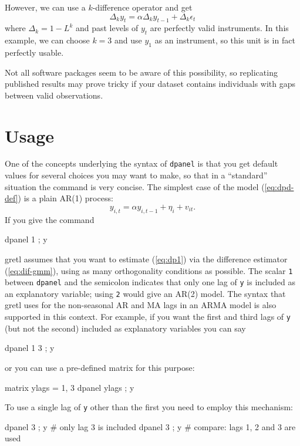 However, we can use a $k$-difference operator and get
\[
\Delta_k y_t = \alpha \Delta_k y_{t-1} + \Delta_k \epsilon_t
\]
where $\Delta_k = 1 - L^k$ and past levels of $y_t$ are perfectly
valid instruments. In this example, we can choose $k=3$ and use $y_1$
as an instrument, so this unit is in fact perfectly usable.

Not all software packages seem to be aware of this possibility, so
replicating published results may prove tricky if your dataset
contains individuals with gaps between valid observations.

\section{Usage}
\label{sec:dpanel-usage}

One of the concepts underlying the syntax of \texttt{dpanel} is that
you get default values for several choices you may want to make, so
that in a ``standard'' situation the command is very concise.  The
simplest case of the model (\ref{eq:dpd-def}) is a plain AR(1)
process:
\begin{equation}
\label{eq:dp1}
  y_{i,t} = \alpha y_{i,t-1} + \eta_{i} + v_{it} .
\end{equation}
If you give the command
\begin{code}
  dpanel 1 ; y
\end{code}
gretl assumes that you want to estimate (\ref{eq:dp1}) via the
difference estimator (\ref{eq:dif-gmm}), using as many orthogonality
conditions as possible.  The scalar \texttt{1} between \texttt{dpanel}
and the semicolon indicates that only one lag of \texttt{y} is
included as an explanatory variable; using \texttt{2} would give an
AR(2) model. The syntax that gretl uses for the non-seasonal AR and MA
lags in an ARMA model is also supported in this context. For
example, if you want the first and third lags of \texttt{y} (but not
the second) included as explanatory variables you can say
\begin{code}
  dpanel {1 3} ; y
\end{code}
or you can use a pre-defined matrix for this purpose:
\begin{code}
  matrix ylags = {1, 3}
  dpanel ylags ; y
\end{code}
To use a single lag of \texttt{y} other than the first you need to
employ this mechanism:
\begin{code}
  dpanel {3} ; y # only lag 3 is included
  dpanel 3 ; y   # compare: lags 1, 2 and 3 are used
\end{code}

